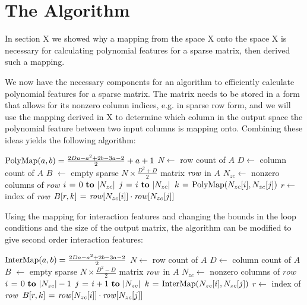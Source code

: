 \documentclass[11pt,twocolumn]{article}
\begin{document}
\section{The Algorithm}
In section X we showed why a mapping from the space X
onto the space X is necessary for calculating polynomial features for a sparse matrix, then
derived such a mapping.

We now have the necessary components for an algorithm to efficiently calculate polynomial features for
a sparse matrix. The matrix needs to be stored in a form that allows for its nonzero column indices, e.g. in sparse row form,
and we will use the mapping derived in X to determine which column in the output space
the polynomial feature between two input columns is mapping onto. Combining these ideas yields the following algorithm:

\begin{codebox}
\footnotesize
{}
    \zi $\func{PolyMap}(a, b) = \frac{2Da-a^2+2b-3a-2}{2}+a+1$
    \zi $N \gets$ row count of $A$
    \zi $D \gets$ column count of $A$
    \zi $B$ $\gets$ empty sparse $N \times \frac{D^2+D}{2}$ matrix
    \zi \For $\id{row}$ in $A$ \Do
    \zi     $N_{zc} \gets$ nonzero columns of $row$
    \zi     \For $i \gets 0 \To |N_{zc}|$ \Do
    \zi         \For $j \gets i \To |N_{zc}|$ \Do
    \zi             $k \gets \func{PolyMap}(N_{zc}[i], N_{zc}[j])$
    \zi             $r \gets$ index of $\id{row}$
    \zi             $B[r, k] \gets \id{row}[N_{zc}[i]] \cdot \id{row}[N_{zc}[j]]$
                \End
            \End
       	\End
\end{codebox}

Using the mapping for interaction features and changing the bounds in the loop conditions and the size of the output matrix, 
the algorithm can be modified to give second order interaction features:

\begin{codebox}
\footnotesize
{}
    \zi $\func{InterMap}(a, b) = \frac{2Da-a^2+2b-3a-2}{2}$
    \zi $N \gets$ row count of $A$
    \zi $D \gets$ column count of $A$
    \zi $B$ $\gets$ empty sparse $N \times \frac{D^2-D}{2}$ matrix
    \zi \For $\id{row}$ in $A$ \Do
    \zi     $N_{zc} \gets$ nonzero columns of $row$
    \zi     \For $i \gets 0 \To |N_{zc}|-1$ \Do
    \zi         \For $j \gets i+1 \To |N_{zc}|$ \Do
    \zi             $k \gets \func{InterMap}(N_{zc}[i], N_{zc}[j])$
    \zi             $r \gets$ index of $\id{row}$
    \zi             $B[r, k] \gets \id{row}[N_{zc}[i]] \cdot \id{row}[N_{zc}[j]]$
                \End
            \End
       	\End
\end{codebox}
\end{document}
